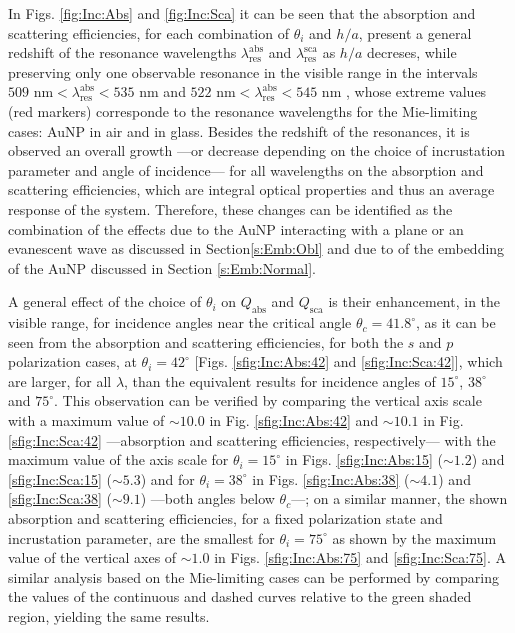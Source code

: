 In Figs. \ref{fig:Inc:Abs} and \ref{fig:Inc:Sca} it can be seen that the absorption and scattering efficiencies, for each combination of $\theta_i$ and $h/a$, present a general redshift of the resonance wavelengths $\lambda_\text{res}^\text{abs}$ and $\lambda_\text{res}^\text{sca}$ as $h/a$ decreses, while preserving only one observable resonance in the visible range in the intervals $509\text{ nm} < \lambda_\text{res}^\text{abs} < 535 \text{ nm}$ and  $522\text{ nm} < \lambda_\text{res}^\text{abs} < 545 \text{ nm}$ , whose extreme values (red markers) corresponde to the resonance wavelengths for the Mie-limiting cases: AuNP in air and in glass. Besides the redshift of the resonances, it is observed an overall growth ---or decrease depending on the choice of incrustation parameter and angle of incidence--- for all wavelengths on the absorption and scattering efficiencies, which are integral optical properties and thus an average response of the system. Therefore, these changes can be identified as the combination of the effects due to  the AuNP interacting with a plane or an evanescent wave as discussed in Section\ref{s:Emb:Obl} and due to of the embedding of the AuNP discussed in Section \ref{s:Emb:Normal}.

A general effect of the choice of $\theta_i$ on $Q_\text{abs}$ and $Q_\text{sca}$ is their enhancement, in the visible range, for incidence angles near the critical angle $\theta_c = 41.8^\circ$, as it can be seen from the absorption and scattering efficiencies, for both the $s$ and $p$ polarization cases, at $\theta_i = 42^\circ$ [Figs. \ref{sfig:Inc:Abs:42} and \ref{sfig:Inc:Sca:42}], which are larger, for all $\lambda$, than the equivalent results for incidence angles of $15^\circ$, $38^\circ$ and $75^\circ$. This observation can be verified by comparing the vertical axis scale with a maximum value of $\sim 10.0$ in Fig. \ref{sfig:Inc:Abs:42} and  $\sim 10.1$ in Fig. \ref{sfig:Inc:Sca:42} ---absorption and scattering efficiencies, respectively--- with the maximum value of the axis scale for $\theta_i = 15^\circ$ in Figs. \ref{sfig:Inc:Abs:15} ($\sim 1.2$) and \ref{sfig:Inc:Sca:15} ($\sim 5.3$) and for $\theta_i = 38^\circ$ in  Figs. \ref{sfig:Inc:Abs:38} ($\sim 4.1$) and \ref{sfig:Inc:Sca:38} ($\sim 9.1$) ---both angles below $\theta_c$---; on a similar manner, the shown absorption and scattering efficiencies, for a fixed polarization state and incrustation parameter, are the smallest for $\theta_i = 75^\circ$ as shown by the maximum value of the vertical axes of $\sim 1.0$ in Figs. \ref{sfig:Inc:Abs:75} and \ref{sfig:Inc:Sca:75}. A similar analysis based on the Mie-limiting cases can be performed by comparing the values of the continuous and dashed curves relative to the green shaded region, yielding the same results.

